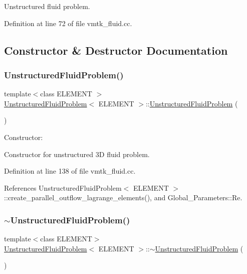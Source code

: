 Unstructured fluid problem. 

Definition at line 72 of file vmtk\+\_\+fluid.\+cc.



\subsection{Constructor \& Destructor Documentation}
\mbox{\label{classUnstructuredFluidProblem_a9751f4afac540e148b3d90ae43dd5187}} 
\subsubsection{\texorpdfstring{Unstructured\+Fluid\+Problem()}{UnstructuredFluidProblem()}}
{\footnotesize\ttfamily template$<$class E\+L\+E\+M\+E\+NT $>$ \\
\hyperlink{classUnstructuredFluidProblem}{Unstructured\+Fluid\+Problem}$<$ E\+L\+E\+M\+E\+NT $>$\+::\hyperlink{classUnstructuredFluidProblem}{Unstructured\+Fluid\+Problem} (\begin{DoxyParamCaption}{ }\end{DoxyParamCaption})}



Constructor\+: 

Constructor for unstructured 3D fluid problem. 

Definition at line 138 of file vmtk\+\_\+fluid.\+cc.



References Unstructured\+Fluid\+Problem$<$ E\+L\+E\+M\+E\+N\+T $>$\+::create\+\_\+parallel\+\_\+outflow\+\_\+lagrange\+\_\+elements(), and Global\+\_\+\+Parameters\+::\+Re.

\mbox{\label{classUnstructuredFluidProblem_a4d660faa6bae35197a4ea73139ac9963}} 
\subsubsection{\texorpdfstring{$\sim$\+Unstructured\+Fluid\+Problem()}{~UnstructuredFluidProblem()}}
{\footnotesize\ttfamily template$<$class E\+L\+E\+M\+E\+NT$>$ \\
\hyperlink{classUnstructuredFluidProblem}{Unstructured\+Fluid\+Problem}$<$ E\+L\+E\+M\+E\+NT $>$\+::$\sim$\hyperlink{classUnstructuredFluidProblem}{Unstructured\+Fluid\+Problem} (\begin{DoxyParamCaption}{ }\end{DoxyParamCaption})\hspace{0.3cm}{\ttfamily [inline]}}




